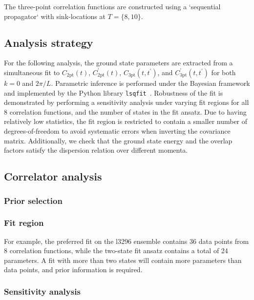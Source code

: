 \documentclass[prd,aps,twocolumn,superscriptaddress,tightenlines,nofootinbib,floatfix,preprintnumbers,10pt]{revtex4-1}
\begin{document}
The three-point correlation functions are constructed using a `sequential propagator` with sink-locations at $T=\{8,10\}$.

\subsection{Analysis strategy}
For the following analysis, the ground state parameters are extracted from a simultaneous fit to $C_{\mathrm{2pt}}(t)$, $C^\prime_{\mathrm{2pt}}(t)$, $C_{\mathrm{3pt}}(t,t^\prime)$, and $C^\prime_{\mathrm{3pt}}(t,t^\prime)$ for both $k=0$ and $2\pi/L$. Parametric inference is performed under the Bayesian framework and implemented by the Python library \texttt{lsqfit}~\cite{lsqfit-9.3}. Robustness of the fit is demonstrated by performing a sensitivity analysis under varying fit regions for all 8 correlation functions, and the number of states in the fit ansatz. Due to having relatively low statistics, the fit region is restricted to contain a smaller number of degrees-of-freedom to avoid systematic errors when inverting the covariance matrix. Additionally, we check that the ground state energy and the overlap factors satisfy the dispersion relation over different momenta.

\subsection{Correlator analysis}

\subsubsection{Prior selection}


\subsubsection{Fit region}

For example, the preferred fit on the l3296 ensemble contains 36 data points from 8 correlation functions, while the two-state fit ansatz contains a total of 24 parameters. A fit with more than two states will contain more parameters than data points, and prior information is required. 

\subsubsection{Sensitivity analysis}
\end{document}
